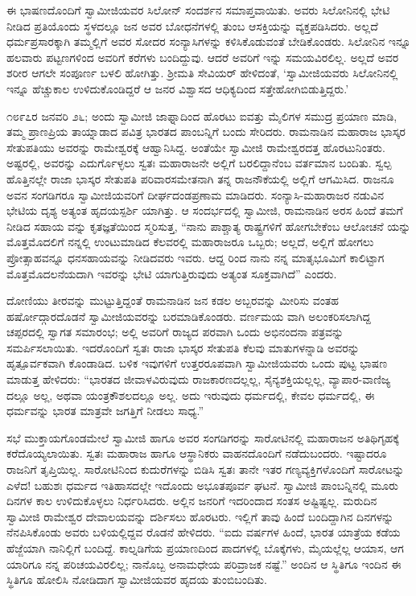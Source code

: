 ಈ ಭಾಷಣದೊಂದಿಗೆ ಸ್ವಾಮೀಜಿಯವರ ಸಿಲೋನ್ ಸಂದರ್ಶನ ಸಮಾಪ್ತವಾಯಿತು. ಅವರು ಸಿಲೋನಿನಲ್ಲಿ ಭೇಟಿ ನೀಡಿದ ಪ್ರತಿಯೊಂದು ಸ್ಥಳದಲ್ಲೂ ಜನ ಅವರ ಬೋಧನೆಗಳಲ್ಲಿ ತುಂಬ ಆಸಕ್ತಿಯನ್ನು ವ್ಯಕ್ತಪಡಿಸಿದರು. ಅಲ್ಲದೆ ಧರ್ಮಪ್ರಸಾರಕ್ಕಾಗಿ ತಮ್ಮಲ್ಲಿಗೆ ಅವರ ಸೋದರ ಸಂನ್ಯಾಸಿಗಳನ್ನು ಕಳಿಸಿಕೊಡುವಂತೆ ಬೇಡಿಕೊಂಡರು. ಸಿಲೋನಿನ ಇನ್ನೂ ಹಲವಾರು ಪಟ್ಟಣಗಳಿಂದ ಅವರಿಗೆ ಕರೆಗಳು ಬಂದಿದ್ದುವು. ಆದರೆ ಅವರಿಗೆ ಇನ್ನು ಸಮಯವಿರಲಿಲ್ಲ. ಅಲ್ಲದೆ ಅವರ ಶರೀರ ಆಗಲೇ ಸಂಪೂರ್ಣ ಬಳಲಿ ಹೋಗಿತ್ತು. ಶ್ರೀಮತಿ ಸೇವಿಯರ್ ಹೇಳಿದಂತೆ, ‘ಸ್ವಾಮೀಜಿಯವರು ಸಿಲೋನಿನಲ್ಲಿ ಇನ್ನೂ ಹೆಚ್ಚುಕಾಲ ಉಳಿದುಕೊಂಡಿದ್ದರೆ ಆ ಜನರ ವಿಶ್ವಾಸದ ಆಧಿಕ್ಯದಿಂದ ಸತ್ತೇಹೋಗಿಬಿಡುತ್ತಿದ್ದರು.’

೧೮೯೭ರ ಜನವರಿ ೨೬; ಅಂದು ಸ್ವಾಮೀಜಿ ಜಾಫ್ನಾದಿಂದ ಹೊರಟು ಐವತ್ತು ಮೈಲಿಗಳ ಸಮುದ್ರ ಪ್ರಯಾಣ ಮಾಡಿ, ತಮ್ಮ ಪ್ರಾಣಪ್ರಿಯ ತಾಯ್ನಾಡಾದ ಪವಿತ್ರ ಭಾರತದ ಪಾಂಬನ್ನಿಗೆ ಬಂದು ಸೇರಿದರು. ರಾಮನಾಡಿನ ಮಹಾರಾಜ ಭಾಸ್ಕರ ಸೇತುಪತಿಯು ಅವರನ್ನು ರಾಮೇಶ್ವರಕ್ಕೆ ಆಹ್ವಾನಿಸಿದ್ದ. ಅಂತೆಯೇ ಸ್ವಾಮೀಜಿ ರಾಮೇಶ್ವರದತ್ತ ಹೊರಟುನಿಂತರು. ಅಷ್ಟರಲ್ಲಿ, ಅವರನ್ನು ಎದುರ್ಗೊಳ್ಳಲು ಸ್ವತಃ ಮಹಾರಾಜನೇ ಅಲ್ಲಿಗೆ ಬರಲಿದ್ದಾನೆಂಬ ವರ್ತಮಾನ ಬಂದಿತು. ಸ್ವಲ್ಪ ಹೊತ್ತಿನಲ್ಲೇ ರಾಜಾ ಭಾಸ್ಕರ ಸೇತುಪತಿ ಪರಿವಾರಸಮೇತನಾಗಿ ತನ್ನ ರಾಜನೌಕೆಯಲ್ಲಿ ಅಲ್ಲಿಗೆ ಆಗಮಿಸಿದ. ರಾಜನೂ ಅವನ ಸಂಗಡಿಗರೂ ಸ್ವಾಮೀಜಿಯವರಿಗೆ ದೀರ್ಘದಂಡಪ್ರಣಾಮ ಮಾಡಿದರು. ಸಂನ್ಯಾಸಿ-ಮಹಾರಾಜರ ನಡುವಿನ ಭೇಟಿಯ ದೃಶ್ಯ ಅತ್ಯಂತ ಹೃದಯಸ್ಪರ್ಶಿ ಯಾಗಿತ್ತು. ಆ ಸಂದರ್ಭದಲ್ಲಿ ಸ್ವಾಮೀಜಿ, ರಾಮನಾಡಿನ ಅರಸ ಹಿಂದೆ ತಮಗೆ ನೀಡಿದ ಸಹಾಯ ವನ್ನು ಕೃತಜ್ಞತೆಯಿಂದ ಸ್ಮರಿಸುತ್ತ, “ನಾನು ಪಾಶ್ಚಾತ್ಯ ರಾಷ್ಟ್ರಗಳಿಗೆ ಹೋಗಬೇಕೆಂಬ ಆಲೋಚನೆ ಯನ್ನು ಮೊತ್ತಮೊದಲಿಗೆ ನನ್ನಲ್ಲಿ ಉಂಟುಮಾಡಿದ ಕೆಲವರಲ್ಲಿ ಮಹಾರಾಜರೂ ಒಬ್ಬರು; ಅಲ್ಲದೆ, ಅಲ್ಲಿಗೆ ಹೋಗಲು ಪ್ರೋತ್ಸಾಹವನ್ನೂ ಧನಸಹಾಯವನ್ನು ನೀಡಿದವರು ಇವರು. ಆದ್ದ ರಿಂದ ನಾನು ನನ್ನ ಮಾತೃಭೂಮಿಗೆ ಕಾಲಿಟ್ಟಾಗ ಮೊತ್ತಮೊದಲನೆಯದಾಗಿ ಇವರನ್ನು ಭೇಟಿ ಯಾಗುತ್ತಿರುವುದು ಅತ್ಯಂತ ಸೂಕ್ತವಾಗಿದೆ” ಎಂದರು.

ದೋಣಿಯು ತೀರವನ್ನು ಮುಟ್ಟುತ್ತಿದ್ದಂತೆ ರಾಮನಾಡಿನ ಜನ ಕಡಲ ಅಬ್ಬರವನ್ನು ಮೀರಿಸು ವಂತಹ ಹರ್ಷೋದ್ಗಾರದೊಡನೆ ಸ್ವಾಮೀಜಿಯವರನ್ನು ಬರಮಾಡಿಕೊಂಡರು. ವರ್ಣಮಯ ವಾಗಿ ಅಲಂಕರಿಸಲಾಗಿದ್ದ ಚಪ್ಪರದಲ್ಲಿ ಸ್ವಾಗತ ಸಮಾರಂಭ; ಅಲ್ಲಿ ಅವರಿಗೆ ರಾಜ್ಯದ ಪರವಾಗಿ ಒಂದು ಅಭಿನಂದನಾ ಪತ್ರವನ್ನು ಸಮರ್ಪಿಸಲಾಯಿತು. ಇದರೊಂದಿಗೆ ಸ್ವತಃ ರಾಜಾ ಭಾಸ್ಕರ ಸೇತುಪತಿ ಕೆಲವು ಮಾತುಗಳನ್ನಾಡಿ ಅವರನ್ನು ಹೃತ್ಪೂರ್ವಕವಾಗಿ ಕೊಂಡಾಡಿದ. ಬಳಿಕ ಇವುಗಳಿಗೆ ಉತ್ತರರೂಪವಾಗಿ ಸ್ವಾಮೀಜಿಯವರು ಒಂದು ಪುಟ್ಟ ಭಾಷಣ ಮಾಡುತ್ತ ಹೇಳಿದರು: “ಭಾರತದ ಜೀವಾಳವಿರುವುದು ರಾಜಕಾರಣದಲ್ಲಲ್ಲ, ಸೈನ್ಯಶಕ್ತಿಯಲ್ಲಲ್ಲ, ವ್ಯಾಪಾರ-ವಾಣಿಜ್ಯ ದಲ್ಲೂ ಅಲ್ಲ, ಅಥವಾ ಯಂತ್ರಕೌಶಲದಲ್ಲೂ ಅಲ್ಲ. ಅದು ಇರುವುದು ಧರ್ಮದಲ್ಲಿ, ಕೇವಲ ಧರ್ಮದಲ್ಲಿ, ಈ ಧರ್ಮವನ್ನು ಭಾರತ ಮಾತ್ರವೇ ಜಗತ್ತಿಗೆ ನೀಡಲು ಸಾಧ್ಯ.”

ಸಭೆ ಮುಕ್ತಾಯಗೊಂಡಮೇಲೆ ಸ್ವಾಮೀಜಿ ಹಾಗೂ ಅವರ ಸಂಗಡಿಗರನ್ನು ಸಾರೋಟಿನಲ್ಲಿ ಮಹಾರಾಜನ ಅತಿಥಿಗೃಹಕ್ಕೆ ಕರೆದೊಯ್ಯಲಾಯಿತು. ಸ್ವತಃ ಮಹಾರಾಜ ಹಾಗೂ ಆಸ್ಥಾನಿಕರು ವಾಹನದೊಂದಿಗೆ ನಡೆದುಬಂದರು. ಇಷ್ಟಾದರೂ ರಾಜನಿಗೆ ತೃಪ್ತಿಯಿಲ್ಲ. ಸಾರೋಟಿನಿಂದ ಕುದುರೆಗಳನ್ನು ಬಿಡಿಸಿ ಸ್ವತಃ ತಾನೇ ಇತರ ಗಣ್ಯವ್ಯಕ್ತಿಗಳೊಂದಿಗೆ ಸಾರೋಟನ್ನು ಎಳೆದ! ಬಹುಶಃ ಧರ್ಮದ ಇತಿಹಾಸದಲ್ಲೇ ಇದೊಂದು ಅಭೂತಪೂರ್ವ ಘಟನೆ. ಸ್ವಾಮೀಜಿ ಪಾಂಬನ್ನಿನಲ್ಲಿ ಮೂರು ದಿನಗಳ ಕಾಲ ಉಳಿದುಕೊಳ್ಳಲು ನಿರ್ಧರಿಸಿದರು. ಅಲ್ಲಿನ ಜನರಿಗೆ ಇದರಿಂದಾದ ಸಂತಸ ಅಷ್ಟಿಷ್ಟಲ್ಲ. ಮರುದಿನ ಸ್ವಾಮೀಜಿ ರಾಮೇಶ್ವರ ದೇವಾಲಯವನ್ನು ದರ್ಶಿಸಲು ಹೊರಟರು. ಇಲ್ಲಿಗೆ ತಾವು ಹಿಂದೆ ಬಂದಿದ್ದಾಗಿನ ದಿನಗಳನ್ನು ನೆನಪಿಸಿಕೊಂಡು ಅವರು ಬಳಿಯಲ್ಲಿದ್ದವ ರೊಡನೆ ಹೇಳಿದರು. “ಐದು ವರ್ಷಗಳ ಹಿಂದೆ, ಭಾರತ ಯಾತ್ರೆಯ ಕಡೆಯ ಹೆಜ್ಜೆಯಾಗಿ ನಾನಿಲ್ಲಿಗೆ ಬಂದಿದ್ದೆ. ಕಾಲ್ನಡಿಗೆಯ ಪ್ರಯಾಣದಿಂದ ಪಾದಗಳಲ್ಲಿ ಬೊಕ್ಕೆಗಳು, ಮೈಯಲ್ಲೆಲ್ಲ ಆಯಾಸ, ಆಗ ಯಾರಿಗೂ ನನ್ನ ಪರಿಚಯವಿರಲಿಲ್ಲ; ನಾನೊಬ್ಬ ಅನಾಮಧೇಯ ಪರಿವ್ರಾಜಕ ನಷ್ಟೆ.” ಅಂದಿನ ಆ ಸ್ಥಿತಿಗೂ ಇಂದಿನ ಈ ಸ್ಥಿತಿಗೂ ಹೋಲಿಸಿ ನೋಡಿದಾಗ ಸ್ವಾಮೀಜಿಯವರ ಹೃದಯ ತುಂಬಿಬಂದಿತು.

